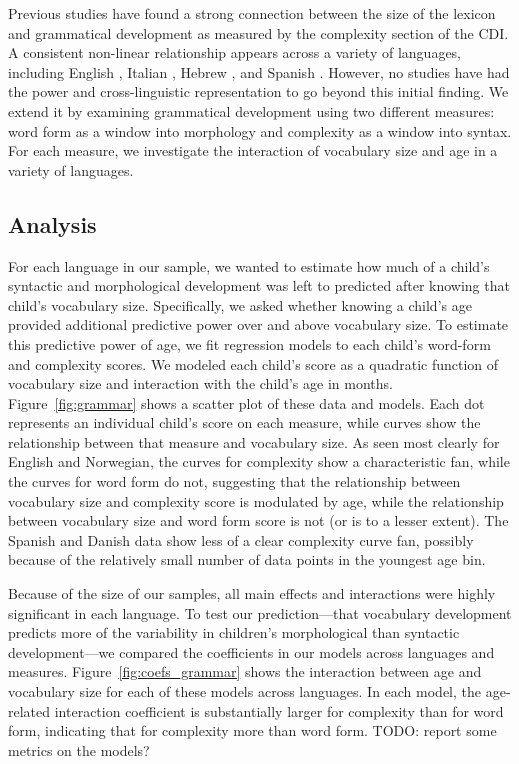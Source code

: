 \documentclass[10pt,letterpaper]{article}
\begin{document}
Previous studies have found a strong connection between the size of the lexicon and grammatical development as measured by the complexity section of the CDI. A consistent non-linear relationship appears across a variety of languages, including English \cite{bates1994,fenson1994}, Italian \cite{caselli1999}, Hebrew \cite{maital2000}, and Spanish \cite{jackson-maldonado2003}. However, no studies have had the power and cross-linguistic representation to go beyond this initial finding. We extend it by examining grammatical development using two different measures: word form as a window into morphology and complexity as a window into syntax. For each measure, we investigate the interaction of vocabulary size and age in a variety of languages.

\subsection{Analysis}

For each language in our sample, we wanted to estimate how much of a child's syntactic and morphological development was left to predicted after knowing that child's vocabulary size. Specifically, we asked whether knowing a child's age provided additional predictive power over and above vocabulary size. To estimate this predictive power of age, we fit regression models to each child's word-form and complexity scores. We modeled each child's score as a quadratic function of vocabulary size and interaction with the child's age in months. Figure~\ref{fig:grammar} shows a scatter plot of these data and models. Each dot represents an individual child's score on each measure, while curves show the relationship between that measure and vocabulary size. As seen most clearly for English and Norwegian, the curves for complexity show a characteristic fan, while the curves for word form do not, suggesting that the relationship between vocabulary size and complexity score is modulated by age, while the relationship between vocabulary size and word form score is not (or is to a lesser extent). The Spanish and Danish data show less of a clear complexity curve fan, possibly because of the relatively small number of data points in the youngest age bin.

Because of the size of our samples, all main effects and interactions were highly significant in each language. To test our prediction---that vocabulary development predicts more of the variability in children's morphological than syntactic development---we compared the coefficients in our models across languages and measures. Figure~\ref{fig:coefs_grammar} shows the interaction between age and vocabulary size for each of these models across languages. In each model, the age-related interaction coefficient is substantially larger for complexity than for word form, indicating that for complexity more than word form. TODO: report some metrics on the models?
\end{document}
